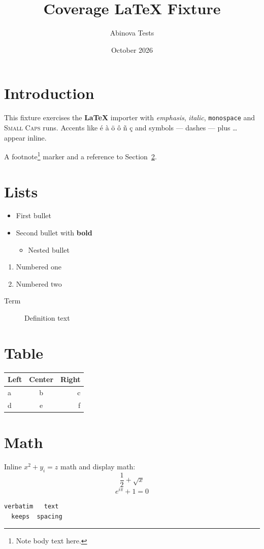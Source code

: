 \documentclass{article}
\title{Coverage \LaTeX{} Fixture}
\author{Abinova Tests}
\date{October 2026}
\begin{document}
\maketitle

\section{Introduction}
This fixture exercises the \textbf{LaTeX} importer with \emph{emphasis},
\textit{italic}, \texttt{monospace} and \textsc{Small Caps} runs.
Accents like \'{e} \`{a} \"{o} \^{o} \~{n} \c{c} and symbols --- dashes ---
plus \ldots{} appear inline.

A footnote\footnote{Note body text here.} marker and a
reference to Section~\ref{sec:lists}.

\section{Lists}
\label{sec:lists}
\begin{itemize}
\item First bullet
\item Second bullet with \textbf{bold}
  \begin{itemize}
  \item Nested bullet
  \end{itemize}
\end{itemize}
\begin{enumerate}
\item Numbered one
\item Numbered two
\end{enumerate}
\begin{description}
\item[Term] Definition text
\end{description}

\section{Table}
\begin{tabular}{lcr}
Left & Center & Right \\
\hline
a & b & c \\
d & e & f \\
\end{tabular}

\section{Math}
Inline $x^2 + y_i = z$ math and display math:
\begin{equation}
\frac{1}{2} + \sqrt{x}
\end{equation}
\[ e^{i\pi} + 1 = 0 \]

\begin{verbatim}
verbatim   text
  keeps  spacing
\end{verbatim}
\end{document}
